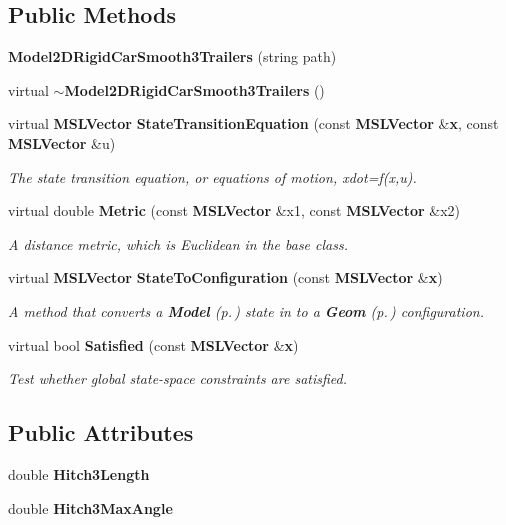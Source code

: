 \subsection*{Public Methods}
\begin{CompactItemize}
\item 
{\bf Model2DRigid\-Car\-Smooth3Trailers} (string path)
\item 
virtual {\bf $\sim$Model2DRigid\-Car\-Smooth3Trailers} ()
\item 
virtual {\bf MSLVector} {\bf State\-Transition\-Equation} (const {\bf MSLVector} \&{\bf x}, const {\bf MSLVector} \&u)
\begin{CompactList}\small\item\em The state transition equation, or equations of motion, xdot=f(x,u).\item\end{CompactList}\item 
virtual double {\bf Metric} (const {\bf MSLVector} \&x1, const {\bf MSLVector} \&x2)
\begin{CompactList}\small\item\em A distance metric, which is Euclidean in the base class.\item\end{CompactList}\item 
virtual {\bf MSLVector} {\bf State\-To\-Configuration} (const {\bf MSLVector} \&{\bf x})
\begin{CompactList}\small\item\em A method that converts a {\bf Model} {\rm (p.\,\pageref{classModel})} state in to a {\bf Geom} {\rm (p.\,\pageref{classGeom})} configuration.\item\end{CompactList}\item 
virtual bool {\bf Satisfied} (const {\bf MSLVector} \&{\bf x})
\begin{CompactList}\small\item\em Test whether global state-space constraints are satisfied.\item\end{CompactList}\end{CompactItemize}
\subsection*{Public Attributes}
\begin{CompactItemize}
\item 
double {\bf Hitch3Length}
\item 
double {\bf Hitch3Max\-Angle}
\end{CompactItemize}


